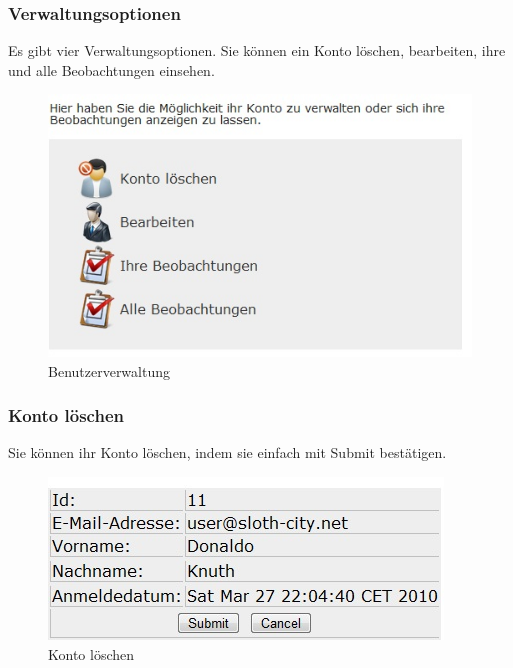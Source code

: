 \documentclass[a4paper,11pt]{scrartcl}
\begin{document}
\subsubsection{Verwaltungsoptionen}
Es gibt vier Verwaltungsoptionen. Sie können ein Konto löschen, bearbeiten, ihre und alle Beobachtungen einsehen.
\begin{figure}[h]
\centering
\includegraphics[width = 10 cm]{img/Benutzerverwaltung2}
\caption{Benutzerverwaltung}
\label{Benutzerverwaltung}
\end{figure}

\subsubsection{Konto löschen}
Sie können ihr Konto löschen, indem sie einfach mit Submit bestätigen.
\begin{figure}[h]
\centering
\includegraphics[width = 10 cm]{img/kontoloeschen}
\caption{Konto löschen}
\label{kontoloeschen}
\end{figure}

\newpage
\end{document}
